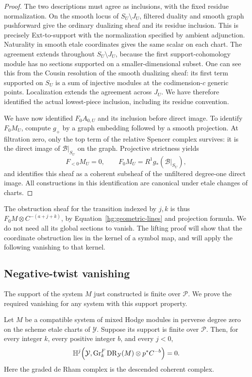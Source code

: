 \begin{proof}
The two descriptions must agree as inclusions, with the fixed
residue normalization.  On the smooth locus of
\(S_U\setminus J_U\), filtered duality and smooth graph
pushforward give the ordinary dualizing sheaf and its residue
inclusion.  This is precisely Ext-to-support with the
normalization specified by ambient adjunction.  Naturality in
smooth etale coordinates gives the same scalar on each chart.
The agreement extends throughout \(S_U\setminus J_U\), because
the first support-cohomology module has no sections supported
on a smaller-dimensional subset.  One can see this from the
Cousin resolution of the smooth dualizing sheaf: its first term
supported on \(S_U\) is a sum of injective modules at the
codimension-\(c\) generic points.  Localization extends the
agreement across \(J_U\).  We have therefore identified the
actual lowest-piece inclusion, including its residue convention.

We have now identified \(F_0A_{0,U}\) and its inclusion before
direct image.  To identify \(F_0M_U\), compute \(g_+\) by a
graph embedding followed by a smooth
projection.  At filtration zero, only the top term of the relative
Spencer complex survives: it is the direct image of
\(\mathcal B|_{S_U}\) on the graph.  Projective strictness yields
\[
 F_{<0}M_U=0,\qquad
 F_0M_U=R^1g_*(\mathcal B|_{S_U}),
\]
and identifies this sheaf as a coherent subsheaf of the unfiltered
degree-one direct image.  All constructions in this identification
are canonical under etale changes of charts.
\end{proof}

The obstruction sheaf for the transition indexed by \(j,k\) is thus
\(F_0M\otimes C^{-(a+j+k)}\), by
Equation~\eqref{hg:geometric-lines} and projection formula.
We do not need all its global sections to vanish. The lifting proof
will show that the coordinate obstruction lies in the kernel of a
symbol map, and will apply the following vanishing to that kernel.

\subsection{Negative-twist vanishing}

The support of the system \(M\) just constructed is finite over
\(\mathcal P\). We prove the required vanishing for any system
with this support property.

\begin{lemma}\label{hg:negative-vanishing}
Let \(M\) be a compatible system of mixed Hodge modules in perverse
degree zero on the scheme etale charts of \(\mathcal Y\).  Suppose
its support is finite over \(\mathcal P\).  Then, for every integer
\(k\), every positive integer \(b\), and every \(j<0\),
\[
 \mathbb H^j\!\left(
   \mathcal Y,\operatorname{Gr}^F_k\operatorname{DR}_{\mathcal Y}(M)\otimes p^*C^{-b}
 \right)=0.
\]
Here the graded de Rham complex is the descended coherent complex.
\end{lemma}

